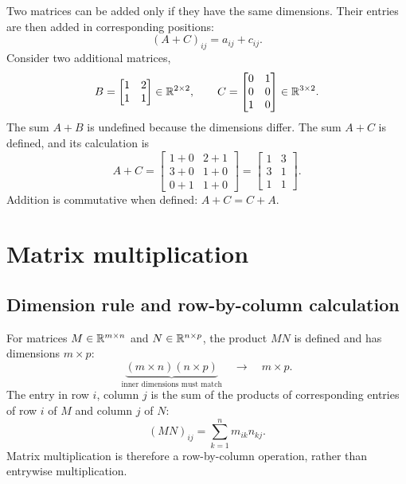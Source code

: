 Two matrices can be added only if they have the same dimensions. Their entries
are then added in corresponding positions:
\[
 (A+C)_{ij}=a_{ij}+c_{ij}.
\]
Consider two additional matrices,
\[
 B=\begin{bmatrix}1&2\\1&1\end{bmatrix}\in\mathbb{R}^{2\times2},
 \qquad
 C=\begin{bmatrix}0&1\\0&0\\1&0\end{bmatrix}\in\mathbb{R}^{3\times2}.
\]
The sum $A+B$ is undefined because the dimensions differ. The sum $A+C$ is
defined, and its calculation is
\begin{equation}
 A+C
 =\begin{bmatrix}1+0&2+1\\3+0&1+0\\0+1&1+0\end{bmatrix}
 =\begin{bmatrix}1&3\\3&1\\1&1\end{bmatrix}.
\end{equation}
Addition is commutative when defined: $A+C=C+A$.

\section{Matrix multiplication}

\subsection{Dimension rule and row-by-column calculation}
For matrices $M\in\mathbb{R}^{m\times n}$ and $N\in\mathbb{R}^{n\times p}$, the product
$MN$ is defined and has dimensions $m\times p$:
\[
 \underbrace{(m\times n)(n\times p)}_{\text{inner dimensions must match}}
 \quad\longrightarrow\quad m\times p.
\]
The entry in row $i$, column $j$ is the sum of the products of corresponding
entries of row $i$ of $M$ and column $j$ of $N$:
\begin{equation}
 (MN)_{ij}=\sum_{k=1}^{n}m_{ik}n_{kj}.
\end{equation}
Matrix multiplication is therefore a row-by-column operation, rather than
entrywise multiplication.

